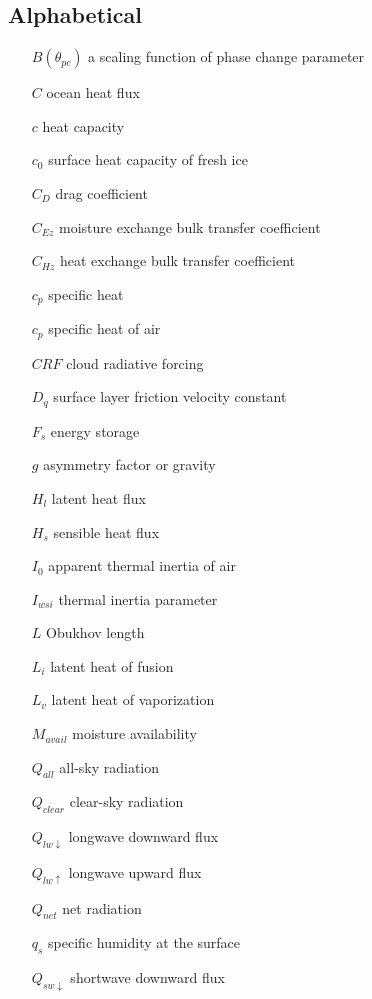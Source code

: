 \subsection{Alphabetical}
\begin{enumerate}
   \item[$B(\theta_{pc})$] a scaling function of phase change parameter
    \item[$C$] ocean heat flux
    \item[$c$] heat capacity
    \item[$c_{0}$] surface heat capacity of fresh ice
    \item[$C_{D}$] drag coefficient
    \item[$C_{Ez}$] moisture exchange bulk transfer coefficient
    \item[$C_{Hz}$] heat exchange bulk transfer coefficient
    \item[$c_{p}$] specific heat
    \item[$c_{p}$] specific heat of air
    \item[$CRF$] cloud radiative forcing
    \item[$D_{q}$] surface layer friction velocity constant
    \item[$F_{s}$] energy storage
    \item[$g$] asymmetry factor or gravity
    \item[$H_{l}$] latent heat flux
    \item[$H_{s}$] sensible heat flux
    \item[$I_{0}$] apparent thermal inertia of air 
    \item[$I_{wsi}$] thermal inertia parameter
    \item[$L$] Obukhov length
    \item[$L_{i}$] latent heat of fusion
    \item[$L_{v}$] latent heat of vaporization
    \item[$M_{avail}$] moisture availability
    \item[$Q_{all}$] all-sky radiation
    \item[$Q_{clear}$] clear-sky radiation
    \item[$Q_{lw \downarrow}$] longwave downward flux
    \item[$Q_{lw \uparrow}$] longwave upward flux
    \item[$Q_{net}$] net radiation
    \item[$q_{s}$] specific humidity at the surface
    \item[$Q_{sw \downarrow}$] shortwave downward flux

\end{enumerate}
